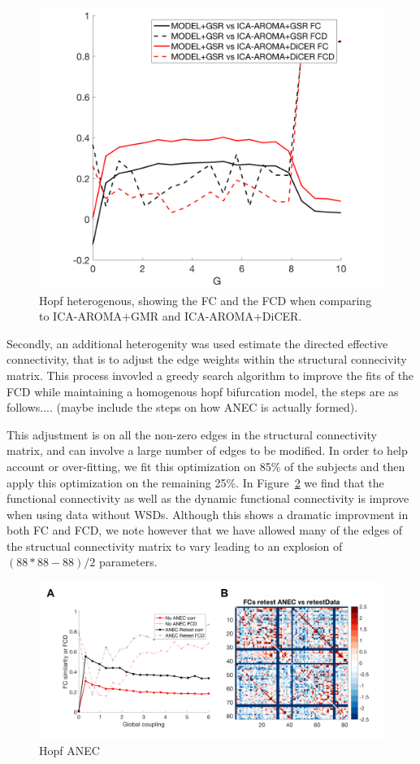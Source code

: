 \documentclass[oneside]{zHenriquesLab-StyleBioRxiv}
\begin{document}
\begin{figure}[ht!]
\includegraphics[width=1\columnwidth]{figs/BTF_heterogenous.png}
\caption{Hopf heterogenous, showing the FC and the FCD when comparing to ICA-AROMA+GMR and ICA-AROMA+DiCER.}\label{fig:FCD_all_fits_BTFa}
\end{figure}

Secondly, an additional heterogenity was used estimate the directed effective connectivity, that is to adjust the edge weights within the structural connecivity matrix. This process invovled a greedy search algorithm to improve the fits of the FCD while maintaining a homogenous hopf bifurcation model, the steps are as follows.... (maybe include the steps on how ANEC is actually formed). 

This adjustment is on all the non-zero edges in the structural connectivity matrix, and can involve a large number of edges to be modified. In order to help account or over-fitting, we fit this optimization on 85\% of the subjects and then apply this optimization on the remaining 25\%. In Figure~\ref{fig:FC_ANEC} we find that the functional connectivity as well as the dynamic functional connectivity is improve when using data without WSDs. Although this shows a dramatic improvment in both FC and FCD, we note however that we have allowed many of the edges of the structual connectivity matrix to vary leading to an explosion of $(88*88 -88)/2$ parameters. 

\begin{figure}[ht!]
\includegraphics[width=1\textwidth]{figs/BTF_ANEC.png}
\caption{Hopf ANEC}\label{fig:FC_ANEC}
\end{figure}
\end{document}
